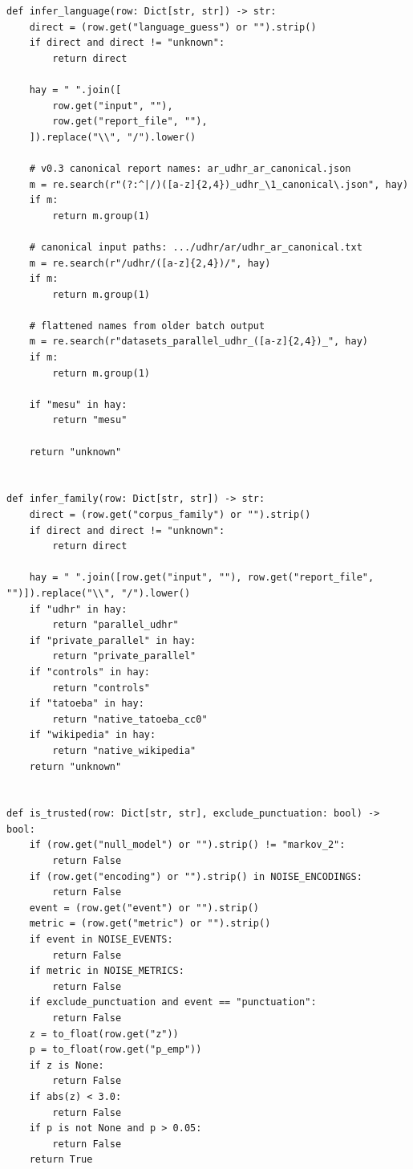 \documentclass[11pt,a4paper]{article}
\begin{document}
\begin{lstlisting}
def infer_language(row: Dict[str, str]) -> str:
    direct = (row.get("language_guess") or "").strip()
    if direct and direct != "unknown":
        return direct

    hay = " ".join([
        row.get("input", ""),
        row.get("report_file", ""),
    ]).replace("\\", "/").lower()

    # v0.3 canonical report names: ar_udhr_ar_canonical.json
    m = re.search(r"(?:^|/)([a-z]{2,4})_udhr_\1_canonical\.json", hay)
    if m:
        return m.group(1)

    # canonical input paths: .../udhr/ar/udhr_ar_canonical.txt
    m = re.search(r"/udhr/([a-z]{2,4})/", hay)
    if m:
        return m.group(1)

    # flattened names from older batch output
    m = re.search(r"datasets_parallel_udhr_([a-z]{2,4})_", hay)
    if m:
        return m.group(1)

    if "mesu" in hay:
        return "mesu"

    return "unknown"


def infer_family(row: Dict[str, str]) -> str:
    direct = (row.get("corpus_family") or "").strip()
    if direct and direct != "unknown":
        return direct

    hay = " ".join([row.get("input", ""), row.get("report_file", "")]).replace("\\", "/").lower()
    if "udhr" in hay:
        return "parallel_udhr"
    if "private_parallel" in hay:
        return "private_parallel"
    if "controls" in hay:
        return "controls"
    if "tatoeba" in hay:
        return "native_tatoeba_cc0"
    if "wikipedia" in hay:
        return "native_wikipedia"
    return "unknown"


def is_trusted(row: Dict[str, str], exclude_punctuation: bool) -> bool:
    if (row.get("null_model") or "").strip() != "markov_2":
        return False
    if (row.get("encoding") or "").strip() in NOISE_ENCODINGS:
        return False
    event = (row.get("event") or "").strip()
    metric = (row.get("metric") or "").strip()
    if event in NOISE_EVENTS:
        return False
    if metric in NOISE_METRICS:
        return False
    if exclude_punctuation and event == "punctuation":
        return False
    z = to_float(row.get("z"))
    p = to_float(row.get("p_emp"))
    if z is None:
        return False
    if abs(z) < 3.0:
        return False
    if p is not None and p > 0.05:
        return False
    return True



\end{lstlisting}
\end{document}
